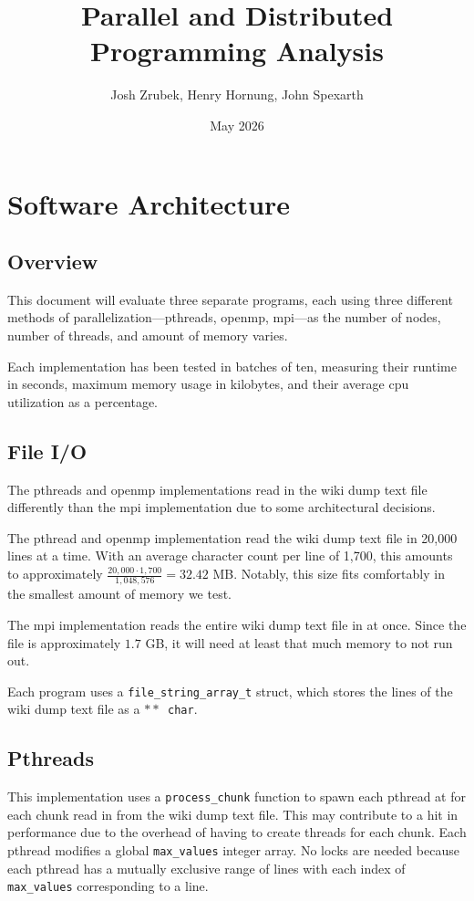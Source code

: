 \documentclass{article}
\title{Parallel and Distributed Programming Analysis}
\author{Josh Zrubek, Henry Hornung, John Spexarth}
\date{May 2026}
\begin{document}
\maketitle

\section*{Software Architecture}

\subsection*{Overview}

This document will evaluate three separate programs, each using three different methods of parallelization—pthreads, openmp, mpi—as the number of nodes, number of threads, and amount of memory varies.

Each implementation has been tested in batches of ten, measuring their runtime in seconds, maximum memory usage in kilobytes, and their average cpu utilization as a percentage.

\subsection*{File I/O}

The pthreads and openmp implementations read in the wiki dump text file differently than the mpi implementation due to some architectural decisions.

The pthread and openmp implementation read the wiki dump text file in 20,000 lines at a time. With an average character count per line of 1,700, this amounts to approximately $\frac{20,000 \cdot 1,700}{1,048,576} = 32.42$ MB. Notably, this size fits comfortably in the smallest amount of memory we test.

The mpi implementation reads the entire wiki dump text file in at once. Since the file is approximately $1.7$ GB, it will need at least that much memory to not run out.

Each program uses a \texttt{file\_string\_array\_t} struct, which stores the lines of the wiki dump text file as a \texttt{$**$ char}.

\subsection*{Pthreads}

This implementation uses a \texttt{process\_chunk} function to spawn each pthread at for each chunk read in from the wiki dump text file. This may contribute to a hit in performance due to the overhead of having to create threads for each chunk. Each pthread modifies a global \texttt{max\_values} integer array. No locks are needed because each pthread has a mutually exclusive range of lines with each index of \texttt{max\_values} corresponding to a line.
\end{document}
